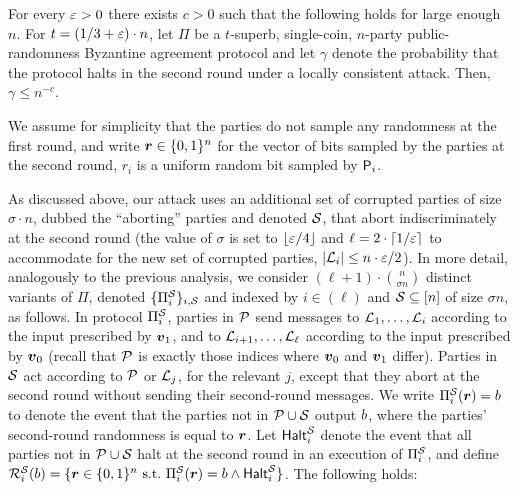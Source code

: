 \begin{theorem}\label{bound:KKL}
For every $\varepsilon> 0$ there exists $c>0$ such that the following holds for large enough $n$. For $t=(1/3+\varepsilon) \cdot n$, let $\Pi$ be a $t$-superb, single-coin, $n$-party public-randomness Byzantine agreement protocol and let $\gamma$ denote the probability that the protocol halts in the second round under a locally consistent attack. Then, $\gamma\le n^{-c}$.
\end{theorem}


We assume for simplicity that the parties do not sample any randomness at the first round, and write ${ \boldsymbol{r}}\in {\{0,1\}^n}$ for the vector of bits sampled by the parties at the second round, \ie $r_i$ is a uniform random bit sampled by $\mathsf{P}_i$.




As discussed above, our attack uses an additional set of corrupted parties of size $\sigma\cdot n$, dubbed the ``aborting'' parties and denoted $\mathcal{S}$, that abort indiscriminately at the second round (the value of $\sigma$ is set to $\lfloor \varepsilon/4 \rfloor$ and $\ell=2\cdot \lceil1/\varepsilon\rceil$ to accommodate for the new set of corrupted parties, \ie $\left|{\cal{L}}_i\right|\le n\cdot \varepsilon /2$). In more detail, analogously to the previous analysis, we consider $(\ell+1)\cdot \binom{n}{\sigma n}$ distinct variants of $\Pi$, denoted $\{\Pi^{\mathcal{S}}_i\}_{i,\mathcal{S}}$ and indexed by $i\in (\ell)$ and $\mathcal{S} \subseteq[n]$ of size $\sigma n$, as follows. In protocol $\Pi_i^{\mathcal{S}}$, parties in $\mathcal{P}$ send messages to ${\cal{L}}_1,\ldots, {\cal{L}}_i$ according to the input prescribed by ${ \boldsymbol{v}}_1$, and to ${\cal{L}}_{i+1},\ldots, {\cal{L}}_\ell$ according to the input prescribed by ${ \boldsymbol{v}}_0$ (recall that $\mathcal{P}$ is exactly those indices where ${ \boldsymbol{v}}_0$ and ${ \boldsymbol{v}}_1$ differ). Parties in $\mathcal{S}$ act according to $\mathcal{P}$ or ${\cal{L}}_j$, for the relevant $j$, except that they abort at the second round without sending their second-round messages. We write $\Pi^{\mathcal{S}}_i({ \boldsymbol{r}})=b$ to denote the event that the parties not in $\mathcal{P}\cup \mathcal{S}$ output $b$, where the parties' second-round randomness is equal to ${ \boldsymbol{r}}$. Let $\mathsf{Halt}^{\mathcal{S}}_i$ denote the event that all parties not in $\mathcal{P}\cup \mathcal{S}$ halt at the second round in an execution of $\Pi^{\mathcal{S}}_i$, and define $\mathcal{R}_{i }^{\mathcal{S}}(b)=\{{ \boldsymbol{r}}\in {\{0,1\}^n}\text{ s.t.\ } \Pi^{\mathcal{S}}_i({ \boldsymbol{r}})=b \land \mathsf{Halt}^{\mathcal{S}}_i\}$. The following holds:

